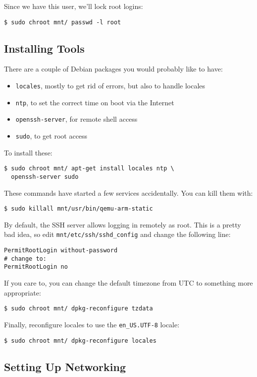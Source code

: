 \documentclass{sockitguide}
\begin{document}
Since we have this user, we'll lock root logins:
\begin{verbatim}
$ sudo chroot mnt/ passwd -l root
\end{verbatim}

\subsection{Installing Tools}

There are a couple of Debian packages you would probably like to have:
\begin{itemize}
\item \texttt{locales}, mostly to get rid of errors, but also to handle locales
\item \texttt{ntp}, to set the correct time on boot via the Internet
\item \texttt{openssh-server}, for remote shell access
\item \texttt{sudo}, to get root access
\end{itemize}

To install these:
\begin{verbatim}
$ sudo chroot mnt/ apt-get install locales ntp \
  openssh-server sudo
\end{verbatim}

These commands have started a few services accidentally. You can kill
them with:
\begin{verbatim}
$ sudo killall mnt/usr/bin/qemu-arm-static
\end{verbatim}

By default, the SSH server allows logging in remotely as root. This is a
pretty bad idea, so edit \texttt{mnt/etc/ssh/sshd\_config} and change the
following line:
\begin{verbatim}
PermitRootLogin without-password
# change to:
PermitRootLogin no
\end{verbatim}

If you care to, you can change the default timezone from UTC to
something more appropriate:
\begin{verbatim}
$ sudo chroot mnt/ dpkg-reconfigure tzdata
\end{verbatim}

Finally, reconfigure locales to use the \texttt{en\_US.UTF-8} locale:
\begin{verbatim}
$ sudo chroot mnt/ dpkg-reconfigure locales
\end{verbatim}

\subsection{Setting Up Networking}
\end{document}
